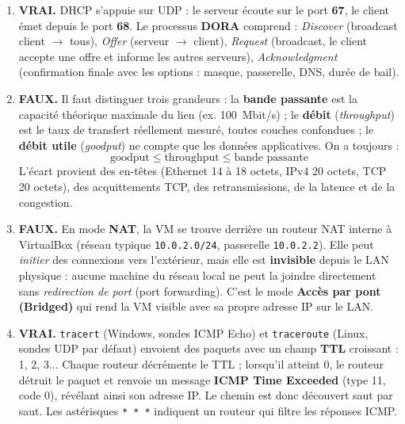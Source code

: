 \documentclass[11pt]{article}
\begin{document}
\begin{corrige}
\begin{enumerate}
    \item \textbf{VRAI.} DHCP s'appuie sur UDP : le serveur écoute sur le port \textbf{67}, le client émet depuis le port \textbf{68}. Le processus \textbf{DORA} comprend : \emph{Discover} (broadcast client $\to$ tous), \emph{Offer} (serveur $\to$ client), \emph{Request} (broadcast, le client accepte une offre et informe les autres serveurs), \emph{Acknowledgment} (confirmation finale avec les options : masque, passerelle, DNS, durée de bail).
    \item \textbf{FAUX.} Il faut distinguer trois grandeurs : la \textbf{bande passante} est la capacité théorique maximale du lien (ex. \SI{100}{Mbit/s}) ; le \textbf{débit} (\emph{throughput}) est le taux de transfert réellement mesuré, toutes couches confondues ; le \textbf{débit utile} (\emph{goodput}) ne compte que les données applicatives. On a toujours :
    \[ \text{goodput} \le \text{throughput} \le \text{bande passante} \]
    L'écart provient des en-têtes (Ethernet 14 à 18 octets, IPv4 20 octets, TCP 20 octets), des acquittements TCP, des retransmissions, de la latence et de la congestion.
    \item \textbf{FAUX.} En mode \textbf{NAT}, la VM se trouve derrière un routeur NAT interne à VirtualBox (réseau typique \texttt{10.0.2.0/24}, passerelle \texttt{10.0.2.2}). Elle peut \emph{initier} des connexions vers l'extérieur, mais elle est \textbf{invisible} depuis le LAN physique : aucune machine du réseau local ne peut la joindre directement sans \emph{redirection de port} (port forwarding). C'est le mode \textbf{Accès par pont (Bridged)} qui rend la VM visible avec sa propre adresse IP sur le LAN.
    \item \textbf{VRAI.} \texttt{tracert} (Windows, sondes ICMP Echo) et \texttt{traceroute} (Linux, sondes UDP par défaut) envoient des paquets avec un champ \textbf{TTL} croissant : 1, 2, 3... Chaque routeur décrémente le TTL ; lorsqu'il atteint 0, le routeur détruit le paquet et renvoie un message \textbf{ICMP Time Exceeded} (type 11, code 0), révélant ainsi son adresse IP. Le chemin est donc découvert saut par saut. Les astérisques \texttt{* * *} indiquent un routeur qui filtre les réponses ICMP.
\end{enumerate}
\end{corrige}
\end{document}
